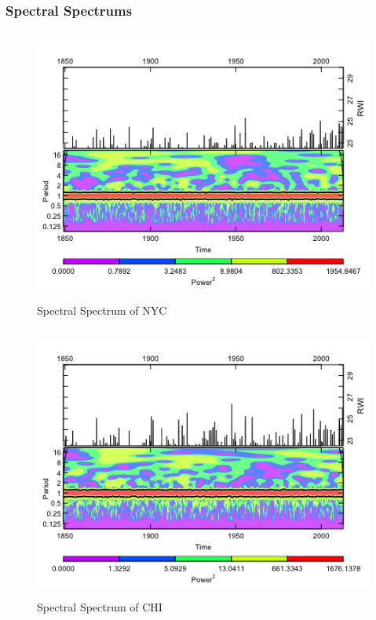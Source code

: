 \documentclass[12pt]{article}
\begin{document}
\subsubsection{Spectral Spectrums} \label{sec:wave}
\begin{figure}[H]
    \includegraphics[width=\textwidth, height=9cm]{Figures/nycWave.png}
    \caption{Spectral Spectrum of NYC}
\end{figure}

\begin{figure}[H]
    \includegraphics[width=\textwidth, height=9cm]{Figures/chiWave.png}
    \caption{Spectral Spectrum of CHI}
\end{figure}
\end{document}
